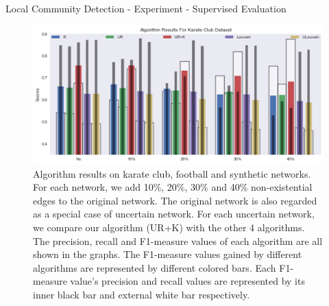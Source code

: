 \documentclass[9pt]{beamer}
\begin{document}
\begin{frame}{Local Community Detection - Experiment - Supervised Evaluation}

\begin{figure}
\includegraphics[scale = 0.2]{image4_change.jpeg}
\caption{Algorithm results on karate club, football and synthetic networks. For each network, we add 10\%, 20\%, 30\% and 40\% non-existential edges to the original network. The original network is also regarded as a special case of uncertain network. For each uncertain network, we compare our algorithm (UR+K) with the other 4 algorithms. The precision, recall and F1-measure values of each algorithm are all shown in the graphs. The F1-measure values gained by different algorithms are represented by different colored bars. Each F1-measure value's precision and recall values are represented by its inner black bar and external white bar respectively. }%
\end{figure}

\end{frame}
\end{document}
